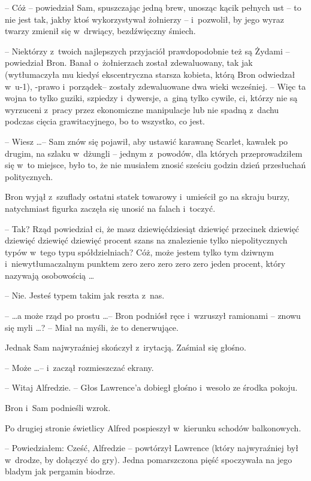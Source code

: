 \documentclass[oneside,polish,11pt,rmheadings]{mwbk}
\begin{document}
-- Cóż -- powiedział Sam, spuszczając jedną brew, unosząc kącik pełnych ust -- to nie jest tak, jakby ktoś wykorzystywał żołnierzy -- i~pozwolił, by jego wyraz twarzy zmienił się w~drwiący, bezdźwięczny śmiech. 

-- Niektórzy z~twoich najlepszych przyjaciół prawdopodobnie też są Żydami -- powiedział Bron. Banał o~żołnierzach został zdewaluowany, tak jak (wytłumaczyła mu kiedyś ekscentryczna starsza kobieta, którą Bron odwiedzał w~u-1), -prawo i~porządek-- zostały zdewaluowane dwa wieki wcześniej. -- Więc ta wojna to tylko guziki, szpiedzy i~dywersje, a~giną tylko cywile, ci, którzy nie są wyrzuceni z~pracy przez ekonomiczne manipulacje lub nie spadną z~dachu podczas cięcia grawitacyjnego, bo to wszystko, co jest. 

-- Wiesz \ldots  -- Sam znów się pojawił, aby ustawić karawanę Scarlet, kawałek po drugim, na szlaku w~dżungli -- jednym z~powodów, dla których przeprowadziłem się w~to miejsce, było to, że nie musiałem znosić sześciu godzin dzień przesłuchań politycznych. 

Bron wyjął z~szuflady ostatni statek towarowy i~umieścił go na skraju burzy, natychmiast figurka zaczęła się unosić na falach i~toczyć. 

-- Tak? Rząd powiedział ci, że masz dziewięćdziesiąt dziewięć przecinek dziewięć dziewięć dziewięć dziewięć procent szans na znalezienie tylko niepolitycznych typów w~tego typu spółdzielniach? Cóż, może jestem tylko tym dziwnym i~niewytłumaczalnym punktem zero zero zero zero zero jeden procent, który nazywają osobowością \ldots  

-- Nie. Jesteś typem takim jak reszta z~nas. 

--  \ldots a może rząd po prostu \ldots  -- Bron podniósł ręce i~wzruszył ramionami -- znowu się myli \ldots ? -- Miał na myśli, że to denerwujące. 

Jednak Sam najwyraźniej skończył z~irytacją. Zaśmiał się głośno. 

-- Może \ldots  -- i~zaczął rozmieszczać ekrany.  

-- Witaj Alfredzie. -- Głos Lawrence'a dobiegł głośno i~wesoło ze środka pokoju. 

Bron i~Sam podnieśli wzrok. 

Po drugiej stronie świetlicy Alfred pospieszył w~kierunku schodów balkonowych. 

-- Powiedziałem: Cześć, Alfredzie -- powtórzył Lawrence (który najwyraźniej był w~drodze, by dołączyć do gry). Jedna pomarszczona pięść spoczywała na jego bladym jak pergamin biodrze. 
\end{document}
